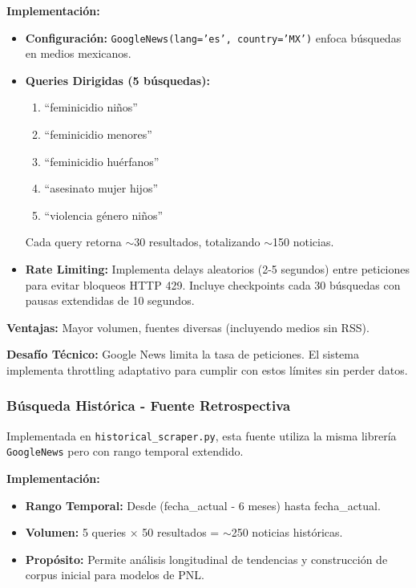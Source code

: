 \textbf{Implementación:}
\begin{itemize}
    \item \textbf{Configuración:} \texttt{GoogleNews(lang='es', country='MX')} enfoca búsquedas en medios mexicanos.
    \item \textbf{Queries Dirigidas (5 búsquedas):}
    \begin{enumerate}
        \item ``feminicidio niños''
        \item ``feminicidio menores''
        \item ``feminicidio huérfanos''
        \item ``asesinato mujer hijos''
        \item ``violencia género niños''
    \end{enumerate}
    Cada query retorna $\sim$30 resultados, totalizando $\sim$150 noticias.
    \item \textbf{Rate Limiting:} Implementa delays aleatorios (2-5 segundos) entre peticiones para evitar bloqueos HTTP 429. Incluye checkpoints cada 30 búsquedas con pausas extendidas de 10 segundos.
\end{itemize}

\textbf{Ventajas:} Mayor volumen, fuentes diversas (incluyendo medios sin RSS).

\textbf{Desafío Técnico:} Google News limita la tasa de peticiones. El sistema implementa throttling adaptativo para cumplir con estos límites sin perder datos.

\subsubsection{Búsqueda Histórica - Fuente Retrospectiva}
\label{subsubsec:historico}

Implementada en \texttt{historical\_scraper.py}, esta fuente utiliza la misma librería \texttt{GoogleNews} pero con rango temporal extendido.

\textbf{Implementación:}
\begin{itemize}
    \item \textbf{Rango Temporal:} Desde (fecha\_actual - 6 meses) hasta fecha\_actual.
    \item \textbf{Volumen:} 5 queries × 50 resultados = $\sim$250 noticias históricas.
    \item \textbf{Propósito:} Permite análisis longitudinal de tendencias y construcción de corpus inicial para modelos de PNL.
\end{itemize}

